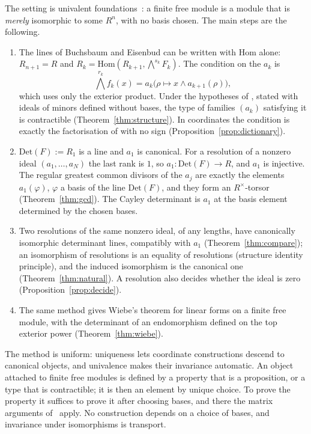 \documentclass[11pt]{amsart}
\theoremstyle{definition}
\theoremstyle{remark}
\newcommand{\Hom}{\mathrm{Hom}}
\newcommand{\Det}{\mathrm{Det}}
\newcommand{\Ex}{{\textstyle\bigwedge}}
\begin{document}
The setting is univalent foundations~\cite{HoTT}: a finite free module is
a module that is \emph{merely} isomorphic to some $R^n$, with no basis
chosen.  The main steps are the following.
\begin{enumerate}
\item The lines of Buchsbaum and Eisenbud can be written with $\Hom$
  alone: $R_{n+1}=R$ and $R_k=\Hom(R_{k+1},\Ex^{s_k}F_k)$.  The
  condition on the $a_k$ is
  \[\Ex^{r_k}f_k(x)=a_k\bigl(\rho\mapsto x\wedge a_{k+1}(\rho)\bigr),\]
  which uses only the exterior product.  Under the hypotheses of
  \cite[Corollary~8.5]{CQ}, stated with ideals of minors defined without
  bases, the type of families $(a_k)$ satisfying it is contractible
  (Theorem~\ref{thm:structure}).  In coordinates the condition is
  exactly the factorisation of \cite[Lemma~8.4]{CQ} with no sign
  (Proposition~\ref{prop:dictionary}).
\item $\Det(F):=R_1$ is a line and $a_1$ is canonical.  For a resolution
  of a nonzero ideal $(a_1,\dots,a_N)$ the last rank is $1$, so
  $a_1:\Det(F)\to R$, and $a_1$ is injective.  The regular greatest
  common divisors of the $a_j$ are exactly the elements $a_1(\varphi)$,
  $\varphi$ a basis of the line $\Det(F)$, and they form an
  $R^\times$-torsor (Theorem~\ref{thm:gcd}).  The Cayley determinant is
  $a_1$ at the basis element determined by the chosen bases.
\item Two resolutions of the same nonzero ideal, of any lengths, have
  canonically isomorphic determinant lines, compatibly with $a_1$
  (Theorem~\ref{thm:compare}); an isomorphism of resolutions is an equality
  of resolutions (structure identity principle), and the induced
  isomorphism is the canonical one (Theorem~\ref{thm:natural}).  A
  resolution also decides whether the ideal is zero
  (Proposition~\ref{prop:decide}).
\item The same method gives Wiebe's theorem for linear forms on a finite
  free module, with the determinant of an endomorphism defined on the
  top exterior power (Theorem~\ref{thm:wiebe}).
\end{enumerate}

The method is uniform: uniqueness lets coordinate constructions descend
to canonical objects, and univalence makes their invariance automatic.  An
object attached to finite free modules is defined by a property that is a
proposition, or a type that is contractible; it is then an element by
unique choice.  To prove the property it suffices to prove it after
choosing bases, and there the matrix arguments of~\cite{CQ} apply.  No
construction depends on a choice of bases, and invariance under
isomorphisms is transport.
\end{document}
